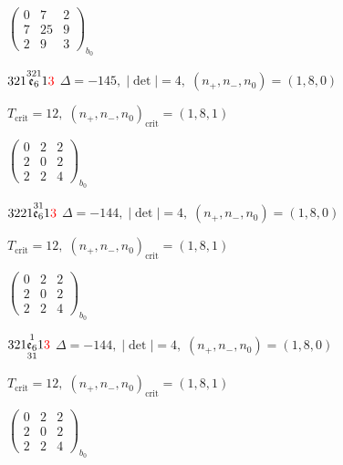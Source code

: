\documentclass[10pt]{article}
\begin{document}
\hspace{2em}$\left(\begin{smallmatrix}0 & 7 & 2 \\ 7 & 25 & 9 \\ 2 & 9 & 3\end{smallmatrix}\right)_{\!b_0}$

\smallskip

$321\overset{321}{\mathfrak{e}_6}1\textcolor{red}{3}$ \quad $\Delta=-145,\; |\det|=4,\; (n_+,n_-,n_0)=(1,8,0)$

\hspace{1em}$T_{\text{crit}}=12,\; (n_+,n_-,n_0)_{\text{crit}}=(1,8,1)$

\hspace{2em}$\left(\begin{smallmatrix}0 & 2 & 2 \\ 2 & 0 & 2 \\ 2 & 2 & 4\end{smallmatrix}\right)_{\!b_0}$

\smallskip

$3221\overset{31}{\mathfrak{e}_6}1\textcolor{red}{3}$ \quad $\Delta=-144,\; |\det|=4,\; (n_+,n_-,n_0)=(1,8,0)$

\hspace{1em}$T_{\text{crit}}=12,\; (n_+,n_-,n_0)_{\text{crit}}=(1,8,1)$

\hspace{2em}$\left(\begin{smallmatrix}0 & 2 & 2 \\ 2 & 0 & 2 \\ 2 & 2 & 4\end{smallmatrix}\right)_{\!b_0}$

\smallskip

$321\overset{1}{\underset{31}{\mathfrak{e}_6}}1\textcolor{red}{3}$ \quad $\Delta=-144,\; |\det|=4,\; (n_+,n_-,n_0)=(1,8,0)$

\hspace{1em}$T_{\text{crit}}=12,\; (n_+,n_-,n_0)_{\text{crit}}=(1,8,1)$

\hspace{2em}$\left(\begin{smallmatrix}0 & 2 & 2 \\ 2 & 0 & 2 \\ 2 & 2 & 4\end{smallmatrix}\right)_{\!b_0}$
\end{document}
